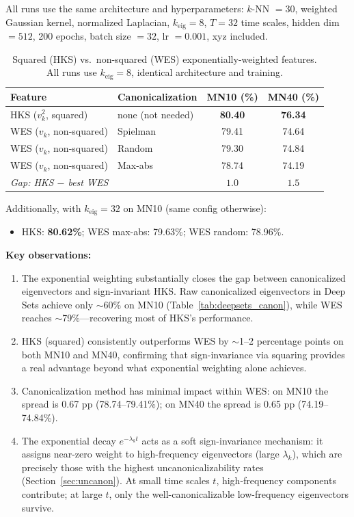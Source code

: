 \documentclass[11pt]{article}
\begin{document}
All runs use the same architecture and hyperparameters: $k$-NN $= 30$, weighted Gaussian
kernel, normalized Laplacian, $k_{\text{eig}} = 8$, $T = 32$ time scales, hidden dim
$= 512$, 200 epochs, batch size $= 32$, lr $= 0.001$, xyz included.

\begin{table}[ht]
\centering
\caption{Squared (HKS) vs.\ non-squared (WES) exponentially-weighted features.
All runs use $k_{\text{eig}} = 8$, identical architecture and training.}
\label{tab:hks_vs_wes}
\begin{tabular}{llcc}
\toprule
\textbf{Feature} & \textbf{Canonicalization} & \textbf{MN10 (\%)} & \textbf{MN40 (\%)} \\
\midrule
HKS ($v_k^2$, squared) & none (not needed) & \textbf{80.40} & \textbf{76.34} \\
\midrule
WES ($v_k$, non-squared) & Spielman & 79.41 & 74.64 \\
WES ($v_k$, non-squared) & Random & 79.30 & 74.84 \\
WES ($v_k$, non-squared) & Max-abs & 78.74 & 74.19 \\
\midrule
\multicolumn{2}{l}{\emph{Gap: HKS $-$ best WES}} & $1.0$ & $1.5$ \\
\bottomrule
\end{tabular}
\end{table}

\noindent Additionally, with $k_{\text{eig}} = 32$ on MN10 (same config otherwise):
\begin{itemize}[nosep]
    \item HKS: \textbf{80.62\%}; WES max-abs: 79.63\%; WES random: 78.96\%.
\end{itemize}

\textbf{Key observations:}
\begin{enumerate}[nosep]
    \item The exponential weighting substantially closes the gap between canonicalized
          eigenvectors and sign-invariant HKS. Raw canonicalized eigenvectors in Deep Sets
          achieve only $\sim$60\% on MN10 (Table~\ref{tab:deepsets_canon}), while WES
          reaches $\sim$79\%---recovering most of HKS's performance.
    \item HKS (squared) consistently outperforms WES by $\sim$1--2 percentage points on
          both MN10 and MN40, confirming that sign-invariance via squaring provides a
          real advantage beyond what exponential weighting alone achieves.
    \item Canonicalization method has minimal impact within WES: on MN10 the spread is
          0.67 pp (78.74--79.41\%); on MN40 the spread is 0.65 pp (74.19--74.84\%).
    \item The exponential decay $e^{-\lambda_k t}$ acts as a soft sign-invariance
          mechanism: it assigns near-zero weight to high-frequency eigenvectors (large
          $\lambda_k$), which are precisely those with the highest uncanonicalizability
          rates (Section~\ref{sec:uncanon}). At small time scales $t$, high-frequency
          components contribute; at large $t$, only the well-canonicalizable low-frequency
          eigenvectors survive.
\end{enumerate}
\end{document}
